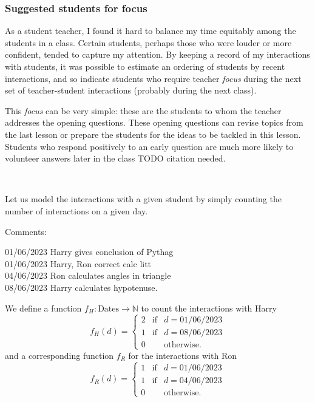 \documentclass[10pt]{article}
\begin{document}
\subsubsection{Suggested students for focus} \label{output_focus}

As a student teacher, I found it hard to balance my time equitably among the students in a class. Certain students, perhaps those who were louder or more confident, tended to capture my attention. By keeping a record of my interactions with students, it was possible to estimate an ordering of students by recent interactions, and so indicate students who require teacher \emph{focus} during the next set of teacher-student interactions (probably during the next class).

This \emph{focus} can be very simple: these are the students to whom the teacher addresses the opening questions. These opening questions can revise topics from the last lesson or prepare the students for the ideas to be tackled in this lesson. Students who respond positively to an early question are much more likely to volunteer answers later in the class TODO citation needed.

\

Let us model the interactions with a given student by simply counting the number of interactions on a given day.

\begin{tcolorbox}
Comments:

01/06/2023 Harry gives conclusion of Pythag \\
01/06/2023 Harry, Ron correct calc litt \\
04/06/2023 Ron calculates angles in triangle \\
08/06/2023 Harry calculates hypotenuse.
\end{tcolorbox}
We define a function $f_H : \mbox{Dates} \to \mathbb{N}$ to count the interactions with Harry
$$ f_{H}(d) = \left\{ \begin{matrix} 2 &  \mbox{if} & d=\mbox{01/06/2023} \\ 1 & \mbox{if} & d=\mbox{08/06/2023}  \\ 0 && \mbox{otherwise.} \end{matrix} \right. $$
and a corresponding function $f_R$ for the interactions with Ron
$$ f_{R}(d) = \left\{ \begin{matrix} 1 &  \mbox{if} & d=\mbox{01/06/2023}  \\ 1 &  \mbox{if} & d=\mbox{04/06/2023}  \\  0 && \mbox{otherwise.} \end{matrix} \right. $$
\end{document}
